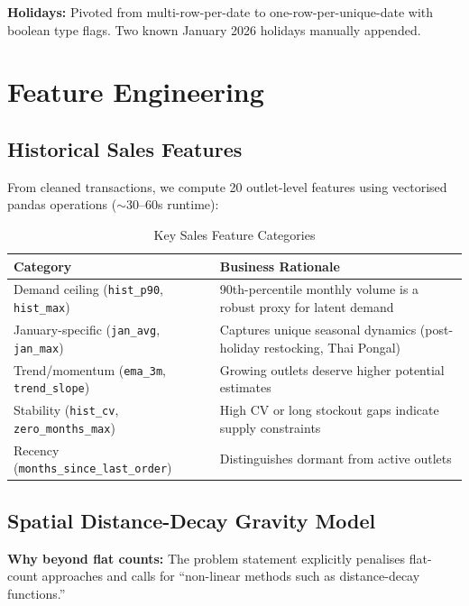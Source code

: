 \documentclass[10.75pt, a4paper]{article}
\begin{document}
\textbf{Holidays:} Pivoted from multi-row-per-date to one-row-per-unique-date with boolean type flags. Two known January 2026 holidays manually appended.

\vspace{5cm} %
\section{Feature Engineering}

\subsection{Historical Sales Features}

From cleaned transactions, we compute 20 outlet-level features using vectorised pandas operations ($\sim$30--60s runtime):

\begin{table}[H]
\centering
\caption{Key Sales Feature Categories}
\begin{tabularx}{\textwidth}{lX}
\toprule
\textbf{Category} & \textbf{Business Rationale} \\
\midrule
Demand ceiling (\texttt{hist\_p90}, \texttt{hist\_max}) & 90th-percentile monthly volume is a robust proxy for latent demand \\
January-specific (\texttt{jan\_avg}, \texttt{jan\_max}) & Captures unique seasonal dynamics (post-holiday restocking, Thai Pongal) \\
Trend/momentum (\texttt{ema\_3m}, \texttt{trend\_slope}) & Growing outlets deserve higher potential estimates \\
Stability (\texttt{hist\_cv}, \texttt{zero\_months\_max}) & High CV or long stockout gaps indicate supply constraints \\
Recency (\texttt{months\_since\_last\_order}) & Distinguishes dormant from active outlets \\
\bottomrule
\end{tabularx}
\end{table}

\subsection{Spatial Distance-Decay Gravity Model}

\textbf{Why beyond flat counts:} The problem statement explicitly penalises flat-count approaches and calls for ``non-linear methods such as distance-decay functions.''
\end{document}
